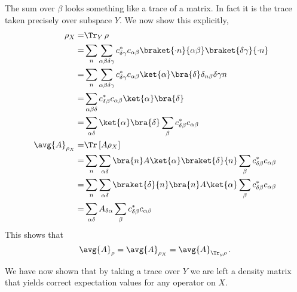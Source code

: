 The sum over $\beta$ looks something like a trace of a matrix.
In fact it is the trace taken precisely over subspace $Y$.
We now show this explicitly,
\begin{align*}
\rho_X
  =& \Tr_Y \, \rho \\
  =& \sum_n \sum_{\alpha \beta \delta \gamma} c^*_{\delta \gamma}c_{\alpha \beta} \braket{\cdot n}{\alpha \beta}\braket{\delta \gamma}{\cdot n} \\
  =& \sum_n \sum_{\alpha \beta \delta \gamma} c^*_{\delta \gamma}c_{\alpha \beta} \ket{\alpha}\bra{\delta}\delta_{n\beta}\delta{\gamma n} \\
  =& \sum_{\alpha \beta \delta} c^*_{\delta \beta}c_{\alpha \beta} \ket{\alpha}\bra{\delta} \\
  =& \sum_{\alpha \delta} \ket{\alpha}\bra{\delta} \sum_{\beta} c^*_{\delta \beta}c_{\alpha \beta} \\
  \avg{A}_{\rho_X}
  =& \Tr \left[ A \rho_X \right] \\
  =& \sum_n \sum_{\alpha \delta} \bra{n} A \ket{\alpha} \braket{\delta}{n} \sum_{\beta} c^*_{\delta \beta}c_{\alpha \beta} \\
  =& \sum_n \sum_{\alpha \delta} \braket{\delta}{n}\bra{n}A\ket{\alpha} \sum_{\beta} c^*_{\delta \beta}c_{\alpha \beta} \\
  =& \sum_{\alpha \delta} A_{\delta \alpha} \sum_{\beta} c^*_{\delta \beta}c_{\alpha \beta}
\end{align*}
This shows that
\begin{equation}
\avg{A}_\rho = \avg{A}_{\rho_X} = \avg{A}_{\Tr_y \rho} \, .
\end{equation}

We have now shown that by taking a trace over $Y$ we are left a density matrix that yields correct expectation values for any operator on $X$.
